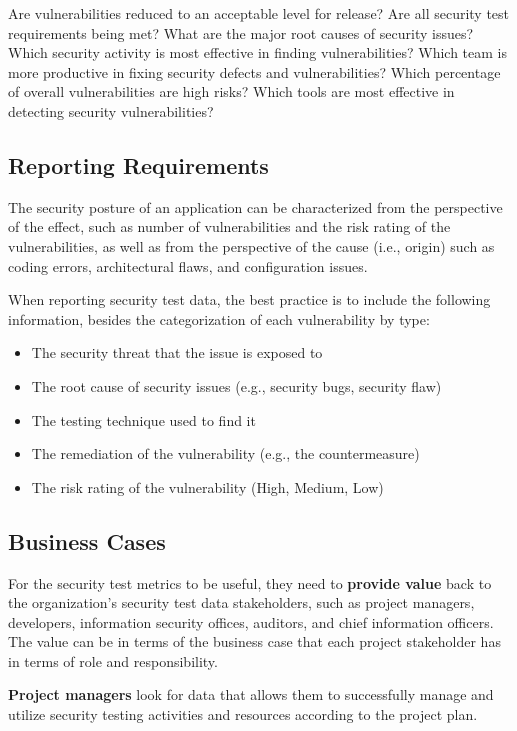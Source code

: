 		Are vulnerabilities reduced to an acceptable level for release? Are all security test requirements being met?
		What are the major root causes of security issues? Which security activity is most effective in finding vulnerabilities? Which team is more productive in fixing security defects and vulnerabilities? 
		Which percentage of overall vulnerabilities are high risks? Which tools are most effective in detecting security vulnerabilities?

		\subsection{Reporting Requirements}

			The security posture of an application can be characterized from the perspective of the effect, 
			such as number of vulnerabilities and the risk rating of the vulnerabilities, as well as from 
			the perspective of the cause (i.e., origin) such as coding errors, architectural flaws, and 
			configuration issues.

			When reporting security test data, the best practice is to include the following information, 
			besides the categorization of each vulnerability by type:
				\begin{itemize}
					\item The security threat that the issue is exposed to
					\item The root cause of security issues (e.g., security bugs, security flaw)
					\item The testing technique used to find it
					\item The remediation of the vulnerability (e.g., the countermeasure)
					\item The risk rating of the vulnerability (High, Medium, Low)
				\end{itemize}

		\subsection{Business Cases}
			For the security test metrics to be useful, they need to {\bf provide value} back to the organization's 
			security test data stakeholders, such as project managers, developers, information security offices,
			auditors, and chief information officers. The value can be in terms of the business case that each 
			project stakeholder has in terms of role and responsibility.

			{\bf Project managers} look for data that allows them to successfully manage and utilize security testing
			activities and resources according to the project plan. 

